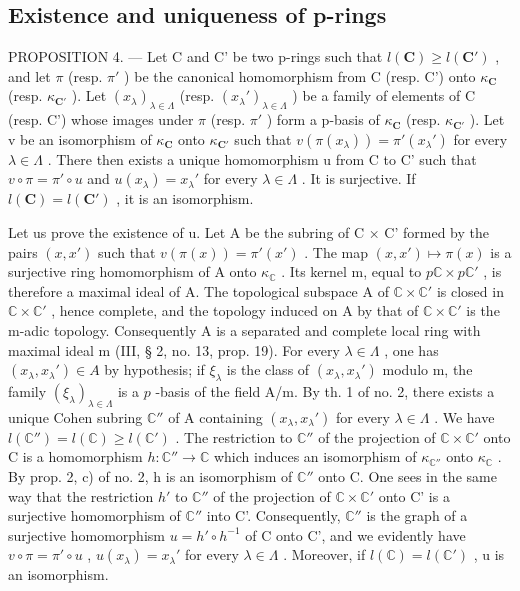\subsection{Existence and uniqueness of p-rings}

PROPOSITION 4. --- Let C and C' be two p-rings such that \(l(\mathbf{C}) \geqslant l(\mathbf{C}')\) , and let \(\pi\) (resp. \(\pi'\) ) be the canonical homomorphism from C (resp. C') onto \(\kappa_{\mathbf{C}}\) (resp. \(\kappa_{\mathbf{C}'}\) ). Let \((x_{\lambda})_{\lambda \in \Lambda}\) (resp. \((x_{\lambda}')_{\lambda \in \Lambda}\) ) be a family of elements of C (resp. C') whose images under \(\pi\) (resp. \(\pi'\) ) form a p-basis of \(\kappa_{\mathbf{C}}\) (resp. \(\kappa_{\mathbf{C}'}\) ). Let v be an isomorphism of \(\kappa_{\mathbf{C}}\) onto \(\kappa_{\mathbf{C}'}\) such that \(v(\pi(x_{\lambda})) = \pi'(x_{\lambda}')\) for every \(\lambda \in \Lambda\) . There then exists a unique homomorphism u from C to C' such that \(v \circ \pi = \pi' \circ u\) and \(u(x_{\lambda}) = x_{\lambda}'\) for every \(\lambda \in \Lambda\) . It is surjective. If \(l(\mathbf{C}) = l(\mathbf{C}')\) , it is an isomorphism.

Let us prove the existence of u. Let A be the subring of C × C' formed by the pairs \((x, x')\) such that \(v(\pi(x)) = \pi'(x')\) . The map \((x, x') \mapsto \pi(x)\) is a surjective ring homomorphism of A onto \(\kappa_{\mathbb{C}}\) . Its kernel m, equal to \(p\mathbb{C} \times p\mathbb{C}'\) , is therefore a maximal ideal of A. The topological subspace A of \(\mathbb{C} \times \mathbb{C}'\) is closed in \(\mathbb{C} \times \mathbb{C}'\) , hence complete, and the topology induced on A by that of \(\mathbb{C} \times \mathbb{C}'\) is the m-adic topology. Consequently A is a separated and complete local ring with maximal ideal m (III, § 2, no. 13, prop. 19). For every \(\lambda \in \Lambda\) , one has \((x_{\lambda}, x_{\lambda}') \in A\) by hypothesis; if \(\xi_{\lambda}\) is the class of \((x_{\lambda}, x_{\lambda}')\) modulo m, the family \((\xi_{\lambda})_{\lambda \in \Lambda}\) is a \(p\) -basis of the field A/m. By th. 1 of no. 2, there exists a unique Cohen subring \(\mathbb{C}''\) of A containing \((x_{\lambda}, x_{\lambda}')\) for every \(\lambda \in \Lambda\) . We have \(l(\mathbb{C}'') = l(\mathbb{C}) \geqslant l(\mathbb{C}')\) . The restriction to \(\mathbb{C}''\) of the projection of \(\mathbb{C} \times \mathbb{C}'\) onto C is a homomorphism \(h: \mathbb{C}'' \to \mathbb{C}\) which induces an isomorphism of \(\kappa_{\mathbb{C}''}\) onto \(\kappa_{\mathbb{C}}\) . By prop. 2, c) of no. 2, h is an isomorphism of \(\mathbb{C}''\) onto C. One sees in the same way that the restriction \(h'\) to \(\mathbb{C}''\) of the projection of \(\mathbb{C} \times \mathbb{C}'\) onto C' is a surjective homomorphism of \(\mathbb{C}''\) into C'. Consequently, \(\mathbb{C}''\) is the graph of a surjective homomorphism \(u = h' \circ h^{-1}\) of C onto C', and we evidently have \(v \circ \pi = \pi' \circ u\) , \(u(x_{\lambda}) = x_{\lambda}'\) for every \(\lambda \in \Lambda\) . Moreover, if \(l(\mathbb{C}) = l(\mathbb{C}')\) , u is an isomorphism.

